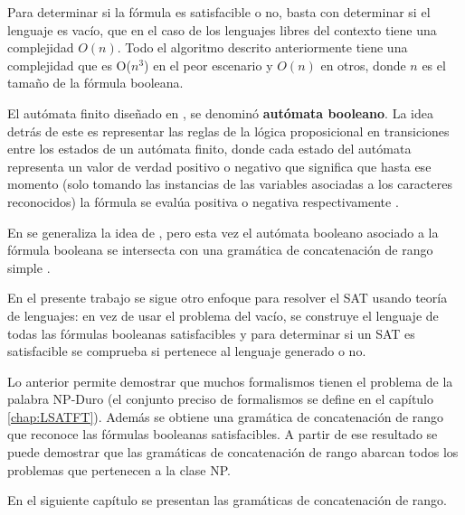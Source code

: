 Para determinar si la fórmula es satisfacible o no, basta con determinar si el lenguaje es vacío, que en el caso de los lenguajes libres del contexto tiene una complejidad $O(n)$. Todo el algoritmo descrito anteriormente tiene una complejidad que es O($n^3$) en el peor escenario y $O(n)$ en otros, donde $n$ es el tamaño de la fórmula booleana.

El autómata finito diseñado en \cite{aCFSAT}, se denominó \textbf{autómata booleano}. La idea detrás de este es 
representar las reglas de la lógica proposicional en transiciones entre los estados de un autómata finito, 
donde cada estado del autómata representa un valor de verdad positivo o negativo que significa que hasta ese 
momento (solo tomando las instancias de las variables asociadas a los caracteres reconocidos) la fórmula se 
evalúa positiva o negativa respectivamente \cite{aCFSAT}.

En \cite{aSRCSAT} se generaliza la idea de \cite{aCFSAT}, pero esta vez el autómata booleano asociado a la fórmula booleana se intersecta con una gramática de concatenación de rango simple \cite{mainRCGBib}.

En el presente trabajo se sigue otro enfoque para resolver el SAT usando teoría de lenguajes: en vez de usar el 
problema del vacío, se construye el lenguaje de todas las fórmulas booleanas satisfacibles y para determinar 
si un SAT es satisfacible se comprueba si pertenece al lenguaje generado o no. 

Lo anterior permite demostrar que muchos formalismos tienen el problema de la palabra NP-Duro 
(el conjunto preciso de formalismos se define en el capítulo \ref{chap:LSATFT}). 
Además se obtiene una gramática de concatenación de rango que reconoce las fórmulas booleanas 
satisfacibles. A partir de ese resultado se puede demostrar que las gramáticas de concatenación de rango 
abarcan todos los problemas que pertenecen a la clase NP.

En el siguiente capítulo se presentan las gramáticas de concatenación de rango.